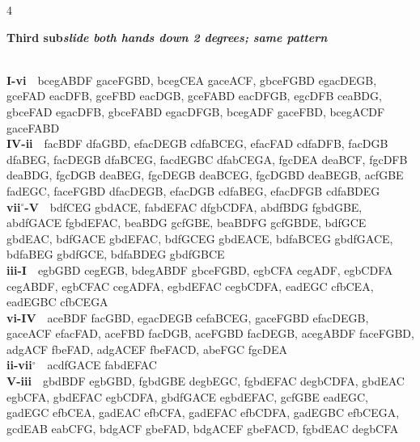 \documentclass[letterpaper,12pt]{article}
\begin{document}
\newpage
\vspace*{-5mm}
\setlength{\columnsep}{3mm}
\begin{multicols}{4}
\setlength{\parindent}{0pt}\raggedright
\fontsize{9}{11}\selectfont
\noindent\colorbox{hdr1}{\begin{minipage}{\dimexpr\linewidth-2\fboxsep\relax}\raggedright\color{white}\bfseries Third sub\quad\normalfont\itshape slide both hands down 2 degrees; same pattern\end{minipage}}\\[0.1mm]
\noindent\hangindent=0.25in {\color{lhcol}\bfseries I-vi}~~{\ttfamily bcegABDF gaceFGBD, bcegCEA gaceACF, gbceFGBD egacDEGB, gceFAD eacDFB, gceFBD eacDGB, gceFABD eacDFGB, egcDFB ceaBDG, gbceFAD egacDFB, gbceFABD egacDFGB, bcegADF gaceFBD, bcegACDF gaceFABD}\\[0.1mm]
\noindent\hangindent=0.25in {\color{lhcol}\bfseries IV-ii}~~{\ttfamily facBDF dfaGBD, efacDEGB cdfaBCEG, efacFAD cdfaDFB, facDGB dfaBEG, facDEGB dfaBCEG, facdEGBC dfabCEGA, fgcDEA deaBCF, fgcDFB deaBDG, fgcDGB deaBEG, fgcDEGB deaBCEG, fgcDGBD deaBEGB, acfGBE fadEGC, faceFGBD dfacDEGB, efacDGB cdfaBEG, efacDFGB cdfaBDEG}\\[0.1mm]
\noindent\hangindent=0.25in {\color{lhcol}\bfseries vii$^\circ$-V}~~{\ttfamily bdfCEG gbdACE, fabdEFAC dfgbCDFA, abdfBDG fgbdGBE, abdfGACE fgbdEFAC, beaBDG gcfGBE, beaBDFG gcfGBDE, bdfGCE gbdEAC, bdfGACE gbdEFAC, bdfGCEG gbdEACE, bdfaBCEG gbdfGACE, bdfaBEG gbdfGCE, bdfaBDEG gbdfGBCE}\\[0.1mm]
\noindent\hangindent=0.25in {\color{lhcol}\bfseries iii-I}~~{\ttfamily egbGBD cegEGB, bdegABDF gbceFGBD, egbCFA cegADF, egbCDFA cegABDF, egbCFAC cegADFA, egbdEFAC cegbCDFA, eadEGC cfbCEA, eadEGBC cfbCEGA}\\[0.1mm]
\noindent\hangindent=0.25in {\color{lhcol}\bfseries vi-IV}~~{\ttfamily aceBDF facGBD, egacDEGB cefaBCEG, gaceFGBD efacDEGB, gaceACF efacFAD, aceFBD facDGB, aceFGBD facDEGB, acegABDF faceFGBD, adgACF fbeFAD, adgACEF fbeFACD, abeFGC fgcDEA}\\[0.1mm]
\noindent\hangindent=0.25in {\color{lhcol}\bfseries ii-vii$^\circ$}~~{\ttfamily acdfGACE fabdEFAC}\\[0.1mm]
\noindent\hangindent=0.25in {\color{lhcol}\bfseries V-iii}~~{\ttfamily gbdBDF egbGBD, fgbdGBE degbEGC, fgbdEFAC degbCDFA, gbdEAC egbCFA, gbdEFAC egbCDFA, gbdfGACE egbdEFAC, gcfGBE eadEGC, gadEGC efbCEA, gadEAC efbCFA, gadEFAC efbCDFA, gadEGBC efbCEGA, gcdEAB eabCFG, bdgACF gbeFAD, bdgACEF gbeFACD, fgbdEAC degbCFA}\\[0.1mm]
\vspace{1.5mm}


\end{multicols}
\end{document}
